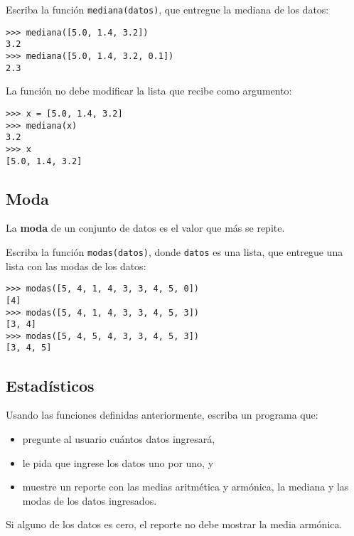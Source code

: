 Escriba la función \lstinline!mediana(datos)!, que entregue la mediana
de los datos:

\begin{lstlisting}
>>> mediana([5.0, 1.4, 3.2])
3.2
>>> mediana([5.0, 1.4, 3.2, 0.1])
2.3
\end{lstlisting}

La función no debe modificar la lista que recibe como argumento:

\begin{lstlisting}
>>> x = [5.0, 1.4, 3.2]
>>> mediana(x)
3.2
>>> x
[5.0, 1.4, 3.2]
\end{lstlisting}

\subsection{Moda}

La \textbf{moda} de un conjunto de datos es el valor que más se repite.

Escriba la función \lstinline!modas(datos)!, donde \lstinline!datos! es
una lista, que entregue una lista con las modas de los datos:

\begin{lstlisting}
>>> modas([5, 4, 1, 4, 3, 3, 4, 5, 0])
[4]
>>> modas([5, 4, 1, 4, 3, 3, 4, 5, 3])
[3, 4]
>>> modas([5, 4, 5, 4, 3, 3, 4, 5, 3])
[3, 4, 5]
\end{lstlisting}

\subsection{Estadísticos}

Usando las funciones definidas anteriormente, escriba un programa que:

\begin{itemize}
\item
  pregunte al usuario cuántos datos ingresará,
\item
  le pida que ingrese los datos uno por uno, y
\item
  muestre un reporte con las medias aritmética y armónica, la mediana y
  las modas de los datos ingresados.
\end{itemize}

Si alguno de los datos es cero, el reporte no debe mostrar la media
armónica.
